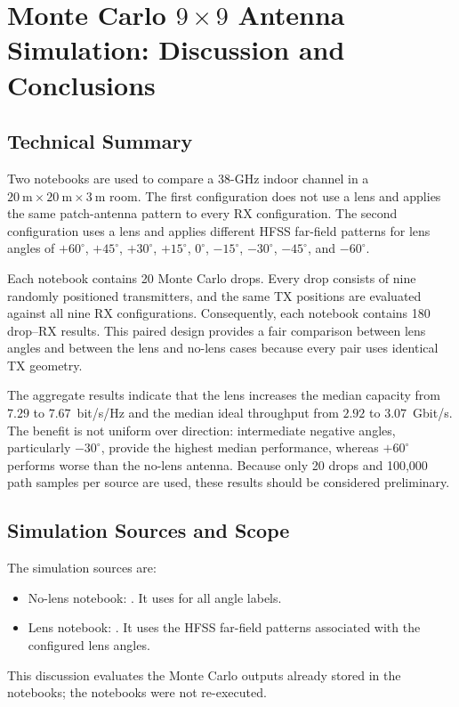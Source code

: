 \documentclass[10pt]{article}
\begin{document}
\section{Monte Carlo \texorpdfstring{$9\times9$}{9x9} Antenna Simulation:
Discussion and Conclusions}

\subsection{Technical Summary}

Two notebooks are used to compare a 38-GHz indoor channel in a
$20~\mathrm{m}\times20~\mathrm{m}\times3~\mathrm{m}$ room. The first
configuration does not use a lens and applies the same patch-antenna pattern
to every RX configuration. The second configuration uses a lens and applies
different HFSS far-field patterns for lens angles of $+60^\circ$, $+45^\circ$,
$+30^\circ$, $+15^\circ$, $0^\circ$, $-15^\circ$, $-30^\circ$,
$-45^\circ$, and $-60^\circ$.

Each notebook contains 20 Monte Carlo drops. Every drop consists of nine
randomly positioned transmitters, and the same TX positions are evaluated
against all nine RX configurations. Consequently, each notebook contains 180
drop--RX results. This paired design provides a fair comparison between lens
angles and between the lens and no-lens cases because every pair uses
identical TX geometry.

The aggregate results indicate that the lens increases the median capacity
from $7.29$ to $7.67$~bit/s/Hz and the median ideal throughput from $2.92$ to
$3.07$~Gbit/s. The benefit is not uniform over direction: intermediate
negative angles, particularly $-30^\circ$, provide the highest median
performance, whereas $+60^\circ$ performs worse than the no-lens antenna.
Because only 20 drops and 100,000 path samples per source are used, these
results should be considered preliminary.

\subsection{Simulation Sources and Scope}

The simulation sources are:
\small
\begin{itemize}
    \item No-lens notebook:
    . It uses
     for all angle labels.
    \item Lens notebook:
    . It uses the HFSS
    far-field patterns associated with the configured lens angles.
\end{itemize}
\normalsize
This discussion evaluates the Monte Carlo outputs already stored in the
notebooks; the notebooks were not re-executed.
\end{document}
